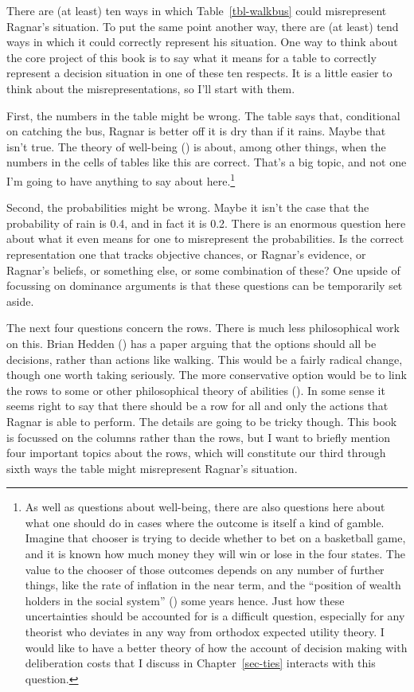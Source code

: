 \documentclass[
  12pt,
  letterpaper,
]{scrbook}
\begin{document}
There are (at least) ten ways in which Table~\ref{tbl-walkbus} could
misrepresent Ragnar's situation. To put the same point another way,
there are (at least) tend ways in which it could correctly represent his
situation. One way to think about the core project of this book is to
say what it means for a table to correctly represent a decision
situation in one of these ten respects. It is a little easier to think
about the misrepresentations, so I'll start with them.

First, the numbers in the table might be wrong. The table says that,
conditional on catching the bus, Ragnar is better off it is dry than if
it rains. Maybe that isn't true. The theory of well-being
() is about, among other
things, when the numbers in the cells of tables like this are correct.
That's a big topic, and not one I'm going to have anything to say about
here.\footnote{As well as questions about well-being, there are also
  questions here about what one should do in cases where the outcome is
  itself a kind of gamble. Imagine that chooser is trying to decide
  whether to bet on a basketball game, and it is known how much money
  they will win or lose in the four states. The value to the chooser of
  those outcomes depends on any number of further things, like the rate
  of inflation in the near term, and the ``position of wealth holders in
  the social system'' ()
  some years hence. Just how these uncertainties should be accounted for
  is a difficult question, especially for any theorist who deviates in
  any way from orthodox expected utility theory. I would like to have a
  better theory of how the account of decision making with deliberation
  costs that I discuss in Chapter~\ref{sec-ties} interacts with this
  question.}

Second, the probabilities might be wrong. Maybe it isn't the case that
the probability of rain is 0.4, and in fact it is 0.2. There is an
enormous question here about what it even means for one to misrepresent
the probabilities. Is the correct representation one that tracks
objective chances, or Ragnar's evidence, or Ragnar's beliefs, or
something else, or some combination of these? One upside of focussing on
dominance arguments is that these questions can be temporarily set
aside.

The next four questions concern the rows. There is much less
philosophical work on this. Brian Hedden
() has a paper arguing that the options
should all be decisions, rather than actions like walking. This would be
a fairly radical change, though one worth taking seriously. The more
conservative option would be to link the rows to some or other
philosophical theory of abilities (). In some sense it seems right to say that there should be a row
for all and only the actions that Ragnar is able to perform. The details
are going to be tricky though. This book is focussed on the columns
rather than the rows, but I want to briefly mention four important
topics about the rows, which will constitute our third through sixth
ways the table might misrepresent Ragnar's situation.
\end{document}
